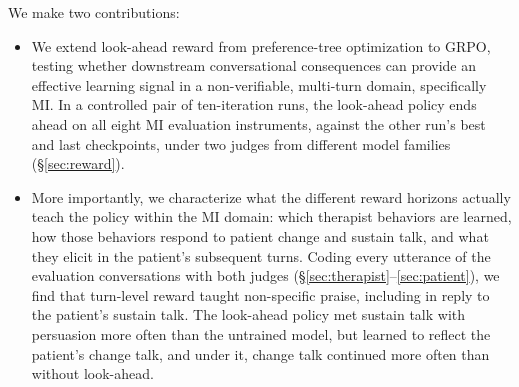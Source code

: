We make two contributions:
\begin{itemize}[leftmargin=*,topsep=3pt,itemsep=2pt,parsep=0pt]
\item We extend look-ahead reward from preference-tree optimization to GRPO, testing whether downstream conversational consequences can provide an effective learning signal in a non-verifiable, multi-turn domain, specifically MI. In a controlled pair of ten-iteration runs, the look-ahead policy ends ahead on all eight MI evaluation instruments, against the other run's best and last checkpoints, under two judges from different model families (\S\ref{sec:reward}).
\item More importantly, we characterize what the different reward horizons actually teach the policy within the MI domain: which therapist behaviors are learned, how those behaviors respond to patient change and sustain talk, and what they elicit in the patient's subsequent turns. Coding every utterance of the evaluation conversations with both judges (\S\ref{sec:therapist}--\ref{sec:patient}), we find that turn-level reward taught non-specific praise, including in reply to the patient's sustain talk. The look-ahead policy met sustain talk with persuasion more often than the untrained model, but learned to reflect the patient's change talk, and under it, change talk continued more often than without look-ahead.
\end{itemize}
